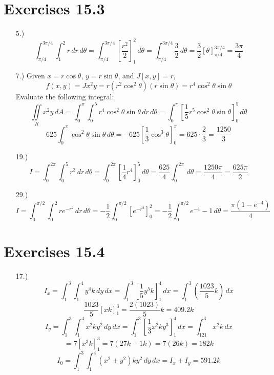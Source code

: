 \documentclass[12pt]{article}
\newcommand{\bracks}[1]{\left[#1\right]}
\newcommand{\parns}[1]{\left(#1\right)}
\begin{document}
\section*{Exercises 15.3}
\begin{itemize}
    \item [5.)] \[\int^{3\pi/4}_{\pi/4}\int^2_1r\,dr\,d\theta=\int^{3\pi/4}_{\pi/4}\bracks{\frac{r^2}{2}}^2_1\,d\theta=\int^{3\pi/4}_{\pi/4}\frac{3}{2}\,d\theta=\frac{3}{2}\bracks{\theta}^{3\pi/4}_{\pi/4}=\frac{3\pi}{4}\]

    \item [7.)] Given $x=r\cos\theta$, $y=r\sin\theta$, and $J[x,y]=r$,
    \[f(x,y)=Jx^2y=r(r^2\cos^2\theta)(r\sin\theta)=r^4\cos^2\theta\sin\theta\]
    Evaluate the following integral:
    \[\iint\limits_{R}x^2y\,dA=\int^{\pi}_0\int^5_0r^4\cos^2\theta\sin\theta\,dr\,d\theta=\int^\pi_0\bracks{\frac{1}{5}r^5\cos^2\theta\sin\theta}^5_0\,d\theta\]
    \[625\int^\pi_0\cos^2\theta\sin\theta\,d\theta=-625\bracks{\frac{1}{3}\cos^3\theta}^\pi_0=625\cdot\frac{2}{3}=\frac{1250}{3}\]

    \item [19.)] \[I=\int^{2\pi}_0\int^5_0r^3\,dr\,d\theta=\int^{2\pi}_0\bracks{\frac{1}{4}r^4}^5_0\,d\theta=\frac{625}{4}\int^{2\pi}_0\,d\theta=\frac{1250\pi}{4}=\frac{625\pi}{2}\]

    \item [29.)] \[I=\int^{\pi/2}_0\int^2_0re^{-r^2}\,dr\,d\theta=-\frac{1}{2}\int^{\pi/2}_0\bracks{e^{-r^2}}^2_0=-\frac{1}{2}\int^{\pi/2}_0e^{-4}-1\,d\theta=\frac{\pi(1-e^{-4})}{4}\]

\end{itemize}
\section*{Exercises 15.4}
\begin{itemize}
    \item [17.)] \[I_x=\int^3_1\int^4_1y^4k\,dy\,dx=\int^3_1\bracks{\frac{1}{5}y^5k}^4_1\,dx=\int^3_1\parns{\frac{1023}{5}k}\,dx\]
    \[\frac{1023}{5}\bracks{xk}^3_1=\frac{2(1023)}{5}k=409.2k\]
    \[I_y=\int^3_1\int^4_1x^2ky^2\,dy\,dx=\int^3_1\bracks{\frac{1}{3}x^2ky^3}^4_1\,dx=\int^3_121x^2k\,dx\]
    \[=7\bracks{x^3k}^3_1=7(27k-1k)=7(26k)=182k\]
    \[I_0=\int^3_1\int^4_1(x^2+y^2)ky^2\,dy\,dx=I_x+I_y=591.2k\]

\end{itemize}
\end{document}
